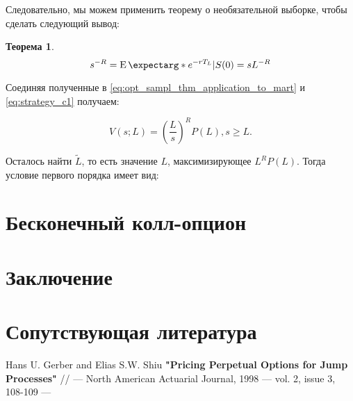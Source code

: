 \documentclass[a4paper,12pt]{article}
\newtheorem{theorem}{Теорема}
\theoremstyle{definition}
\newcommand{\expect}{\operatorname{E}\expectarg}
\begin{document}
Следовательно, мы можем применить теорему о необязательной выборке, чтобы сделать следующий вывод:
\begin{theorem}
\begin{equation}\label{eq:opt_sampl_thm_application_to_mart}
s^{-R} = \expect*{e^{-rT_L} | S(0) = s} L^{-R}
\end{equation}
\end{theorem}

Соединяя полученные в \eqref{eq:opt_sampl_thm_application_to_mart} и \eqref{eq:strategy_c1} получаем:

\begin{equation}\label{eq:strategy_c1_simplified}
V(s; L) = \left(\frac{L}{s}\right)^{R} P(L), s \ge L.
\end{equation}

Осталось найти $\widetilde{L}$, то есть значение $L$, максимизирующее $L^{R} P(L)$. Тогда условие первого порядка имеет вид:

\section{Бесконечный колл-опцион}

\section{Заключение}

\section{Сопутствующая литература}

\begin{thebibliography}{3}
Hans U. Gerber and Elias S.W. Shiu \textbf{"Pricing Perpetual Options for Jump Processes"} // --- North American Actuarial Journal, 1998 --- vol. 2, issue 3, 108-109 ---
\end{thebibliography}

\appendix
\end{document}
